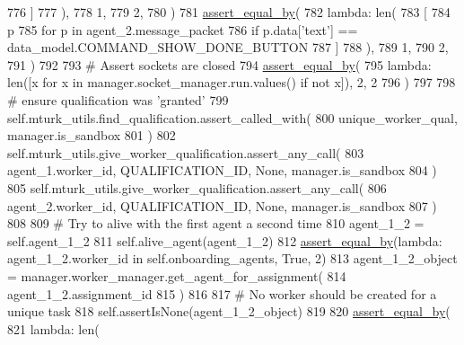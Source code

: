 \begin{DoxyCode}
776                 ]
777             ),
778             1,
779             2,
780         )
781         \hyperlink{namespaceparlai_1_1mturk_1_1core_1_1test_1_1test__full__system_a0b463246d35658a2e422010f13dcf819}{assert\_equal\_by}(
782             \textcolor{keyword}{lambda}: len(
783                 [
784                     p
785                     \textcolor{keywordflow}{for} p \textcolor{keywordflow}{in} agent\_2.message\_packet
786                     \textcolor{keywordflow}{if} p.data[\textcolor{stringliteral}{'text'}] == data\_model.COMMAND\_SHOW\_DONE\_BUTTON
787                 ]
788             ),
789             1,
790             2,
791         )
792 
793         \textcolor{comment}{# Assert sockets are closed}
794         \hyperlink{namespaceparlai_1_1mturk_1_1core_1_1test_1_1test__full__system_a0b463246d35658a2e422010f13dcf819}{assert\_equal\_by}(
795             \textcolor{keyword}{lambda}: len([x \textcolor{keywordflow}{for} x \textcolor{keywordflow}{in} manager.socket\_manager.run.values() \textcolor{keywordflow}{if} \textcolor{keywordflow}{not} x]), 2, 2
796         )
797 
798         \textcolor{comment}{# ensure qualification was 'granted'}
799         self.mturk\_utils.find\_qualification.assert\_called\_with(
800             unique\_worker\_qual, manager.is\_sandbox
801         )
802         self.mturk\_utils.give\_worker\_qualification.assert\_any\_call(
803             agent\_1.worker\_id, QUALIFICATION\_ID, \textcolor{keywordtype}{None}, manager.is\_sandbox
804         )
805         self.mturk\_utils.give\_worker\_qualification.assert\_any\_call(
806             agent\_2.worker\_id, QUALIFICATION\_ID, \textcolor{keywordtype}{None}, manager.is\_sandbox
807         )
808 
809         \textcolor{comment}{# Try to alive with the first agent a second time}
810         agent\_1\_2 = self.agent\_1\_2
811         self.alive\_agent(agent\_1\_2)
812         \hyperlink{namespaceparlai_1_1mturk_1_1core_1_1test_1_1test__full__system_a0b463246d35658a2e422010f13dcf819}{assert\_equal\_by}(\textcolor{keyword}{lambda}: agent\_1\_2.worker\_id \textcolor{keywordflow}{in} self.onboarding\_agents, \textcolor{keyword}{True}, 2)
813         agent\_1\_2\_object = manager.worker\_manager.get\_agent\_for\_assignment(
814             agent\_1\_2.assignment\_id
815         )
816 
817         \textcolor{comment}{# No worker should be created for a unique task}
818         self.assertIsNone(agent\_1\_2\_object)
819 
820         \hyperlink{namespaceparlai_1_1mturk_1_1core_1_1test_1_1test__full__system_a0b463246d35658a2e422010f13dcf819}{assert\_equal\_by}(
821             \textcolor{keyword}{lambda}: len(

\end{DoxyCode}
